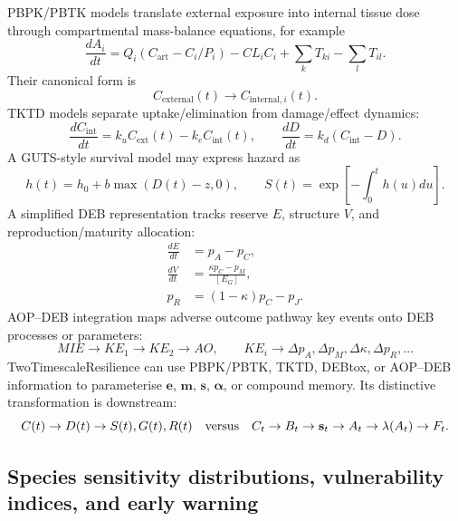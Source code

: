 PBPK/PBTK models translate external exposure into internal tissue dose through compartmental mass-balance equations, for example
\begin{equation}
  \frac{dA_i}{dt}
  = Q_i(C_{\mathrm{art}}-C_i/P_i)-CL_iC_i
    +\sum_k T_{ki}-\sum_l T_{il}.
\end{equation}
Their canonical form is
\begin{equation}
  C_{\mathrm{external}}(t)\rightarrow C_{\mathrm{internal},i}(t).
\end{equation}
TKTD models separate uptake/elimination from damage/effect dynamics:
\begin{equation}
  \frac{dC_{\mathrm{int}}}{dt}=k_u C_{\mathrm{ext}}(t)-k_e C_{\mathrm{int}}(t),
  \qquad
  \frac{dD}{dt}=k_d(C_{\mathrm{int}}-D).
\end{equation}
A GUTS-style survival model may express hazard as
\begin{equation}
  h(t)=h_0+b\max(D(t)-z,0),
  \qquad
  S(t)=\exp\left[-\int_0^t h(u)du\right].
\end{equation}
A simplified DEB representation tracks reserve $E$, structure $V$, and reproduction/maturity allocation:
\begin{align}
  \frac{dE}{dt} &= p_A-p_C,\\
  \frac{dV}{dt} &= \frac{\kappa p_C-p_M}{[E_G]},\\
  p_R &= (1-\kappa)p_C-p_J.
\end{align}
AOP--DEB integration maps adverse outcome pathway key events onto DEB processes or parameters:
\begin{equation}
  MIE\rightarrow KE_1\rightarrow KE_2\rightarrow AO,
  \qquad
  KE_i\rightarrow \Delta p_A,\Delta p_M,\Delta\kappa,\Delta p_R,\ldots
\end{equation}
TwoTimescaleResilience can use PBPK/PBTK, TKTD, DEBtox, or AOP--DEB information to parameterise $\mathbf{e}$, $\mathbf{m}$, $\mathbf{s}$, $\bm{\alpha}$, or compound memory. Its distinctive transformation is downstream:
\begin{equation}
  C(t)\rightarrow D(t)\rightarrow S(t),G(t),R(t)
  \quad\hbox{versus}\quad
  C_t\rightarrow B_t\rightarrow \mathbf{s}_t\rightarrow A_t\rightarrow\lambda(A_t)\rightarrow F_t.
\end{equation}

\subsection{Species sensitivity distributions, vulnerability indices, and early warning}


